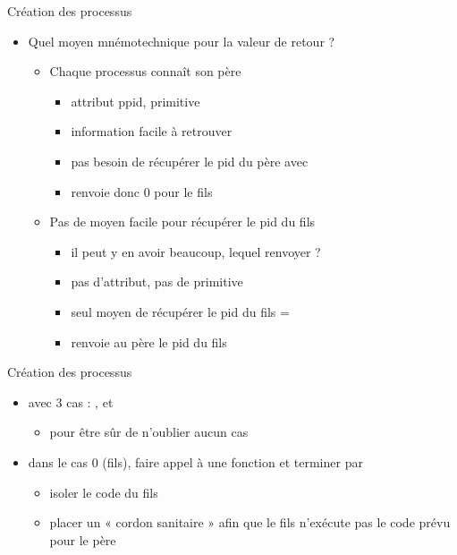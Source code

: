 \begin {frame} {Création des processus}
    \begin {itemize}
	\item Quel moyen mnémotechnique pour la valeur de retour ?
	    \begin {itemize}
		\item Chaque processus connaît son père
		    \begin {itemize}
			\item attribut ppid, primitive 
			\item information facile à retrouver
			\item \implique pas besoin de récupérer
			    le pid du père avec 
			\item {} renvoie donc 0 pour le fils
		    \end {itemize}

		\item Pas de moyen facile pour récupérer le pid du fils
		    \begin {itemize}
			\item il peut y en avoir beaucoup, lequel renvoyer ?
			\item pas d'attribut, pas de primitive
			\item \implique seul moyen de récupérer le pid du
			    fils = 
			\item {} renvoie au père le pid du fils
		    \end {itemize}
	    \end {itemize}
    \end {itemize}
\end {frame}

\begin {frame} {Création des processus}
    \begin {block} {}

    \begin {itemize}
	\item {} avec 3 cas : ,  et

	    \begin {itemize}
		\item pour être sûr de n'oublier aucun cas
	    \end {itemize}
	\item dans le cas 0 (fils), faire appel à une fonction 
	    et terminer par 
	    \begin {itemize}
		\item isoler le code du fils
		\item placer un « cordon sanitaire » afin que le fils
		    n'exécute pas le code prévu pour le père
	    \end {itemize}
    \end {itemize}
    \end {block}
\end {frame}

